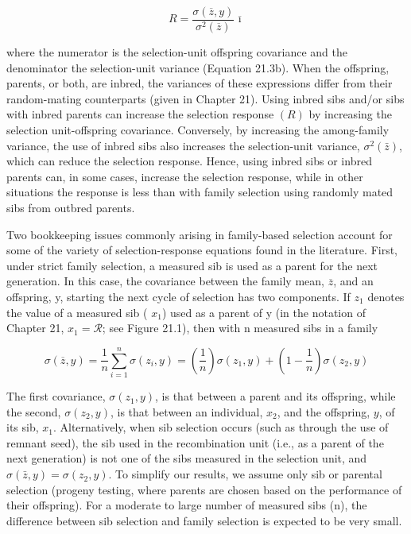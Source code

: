 \documentclass{article}
\begin{document}
\begin{equation}
R=\frac{\sigma(\overline{z},y)}{\sigma^{2}(\overline{z})}\overline{\imath}
\tag{23.7}
\label{eq:23_7}
\end{equation}

where the numerator is the selection-unit offspring covariance and the denominator the selection-unit variance (Equation 21.3b). When the offspring, parents, or both, are inbred, the variances of these expressions differ from their random-mating counterparts (given in Chapter 21). Using inbred sibs and/or sibs with inbred parents can increase the selection response  $ (R) $ by increasing the selection unit-offspring covariance. Conversely, by increasing the among-family variance, the use of inbred sibs also increases the selection-unit variance,  $ \sigma^{2}(\bar{z}) $, which can reduce the selection response. Hence, using inbred sibs or inbred parents can, in some cases, increase the selection response, while in other situations the response is less than with family selection using randomly mated sibs from outbred parents.

Two bookkeeping issues commonly arising in family-based selection account for some of the variety of selection-response equations found in the literature. First, under strict family selection, a measured sib is used as a parent for the next generation. In this case, the covariance between the family mean,  $ \overline{z} $, and an offspring, y, starting the next cycle of selection has two components. If  $ z_{1} $ denotes the value of a measured sib ( $ x_{1} $) used as a parent of y (in the notation of Chapter 21,  $ x_{1} = \mathcal{R} $; see Figure 21.1), then with n measured sibs in a family

\begin{equation}
\sigma(\overline{z},y)=\frac{1}{n}\sum_{i=1}^{n}\sigma(z_{i},y)=\left(\frac{1}{n}\right)\sigma(z_{1},y)+\left(1-\frac{1}{n}\right)\sigma(z_{2},y)
\tag{23.8a}
\label{eq:23_8a}
\end{equation}

The first covariance,  $ \sigma(z_1, y) $, is that between a parent and its offspring, while the second,  $ \sigma(z_2, y) $, is that between an individual,  $ x_2 $, and the offspring,  $ y $, of its sib,  $ x_1 $. Alternatively, when sib selection occurs (such as through the use of remnant seed), the sib used in the recombination unit (i.e., as a parent of the next generation) is not one of the sibs measured in the selection unit, and  $ \sigma(\bar{z}, y) = \sigma(z_2, y) $. To simplify our results, we assume only sib or parental selection (progeny testing, where parents are chosen based on the performance of their offspring). For a moderate to large number of measured sibs (n), the difference between sib selection and family selection is expected to be very small.
\end{document}
